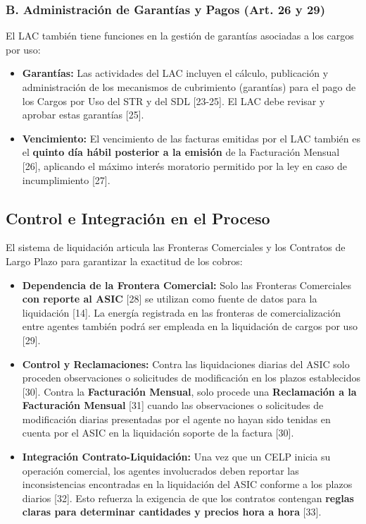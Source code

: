 \documentclass[a5paper]{book}%
\begin{document}
  \subsubsection*{B. Administración de Garantías y Pagos (Art. 26 y 29)}
  El LAC también tiene funciones en la gestión de garantías asociadas a los cargos por uso:
  \begin{itemize}
  	\item \textbf{Garantías:} Las actividades del LAC incluyen el cálculo, publicación y administración de los mecanismos de cubrimiento (garantías) para el pago de los Cargos por Uso del STR y del SDL [23-25]. El LAC debe revisar y aprobar estas garantías [25].
  	\item \textbf{Vencimiento:} El vencimiento de las facturas emitidas por el LAC también es el \textbf{quinto día hábil posterior a la emisión} de la Facturación Mensual [26], aplicando el máximo interés moratorio permitido por la ley en caso de incumplimiento [27].
  \end{itemize}
  
  \subsection{Control e Integración en el Proceso}
  
  El sistema de liquidación articula las Fronteras Comerciales y los Contratos de Largo Plazo para garantizar la exactitud de los cobros:
  
  \begin{itemize}
  	\item \textbf{Dependencia de la Frontera Comercial:} Solo las Fronteras Comerciales \textbf{con reporte al ASIC} [28] se utilizan como fuente de datos para la liquidación [14]. La energía registrada en las fronteras de comercialización entre agentes también podrá ser empleada en la liquidación de cargos por uso [29].
  	\item \textbf{Control y Reclamaciones:} Contra las liquidaciones diarias del ASIC solo proceden observaciones o solicitudes de modificación en los plazos establecidos [30]. Contra la \textbf{Facturación Mensual}, solo procede una \textbf{Reclamación a la Facturación Mensual} [31] cuando las observaciones o solicitudes de modificación diarias presentadas por el agente no hayan sido tenidas en cuenta por el ASIC en la liquidación soporte de la factura [30].
  	\item \textbf{Integración Contrato-Liquidación:} Una vez que un CELP inicia su operación comercial, los agentes involucrados deben reportar las inconsistencias encontradas en la liquidación del ASIC conforme a los plazos diarios [32]. Esto refuerza la exigencia de que los contratos contengan \textbf{reglas claras para determinar cantidades y precios hora a hora} [33].
  \end{itemize}
  
\end{document}
